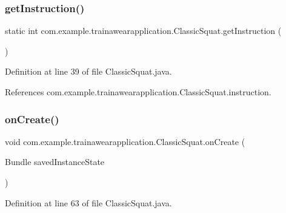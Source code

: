 \subsubsection{\texorpdfstring{getInstruction()}{getInstruction()}}
{\footnotesize\ttfamily static int com.\+example.\+trainawearapplication.\+Classic\+Squat.\+get\+Instruction (\begin{DoxyParamCaption}{ }\end{DoxyParamCaption})\hspace{0.3cm}{\ttfamily [static]}}



Definition at line 39 of file Classic\+Squat.\+java.


\begin{DoxyCode}{0}

\end{DoxyCode}


References com.\+example.\+trainawearapplication.\+Classic\+Squat.\+instruction.

\mbox{\label{classcom_1_1example_1_1trainawearapplication_1_1_classic_squat_afa5582341ba5a9609e4eb7d539741e6a}} 
\subsubsection{\texorpdfstring{onCreate()}{onCreate()}}
{\footnotesize\ttfamily void com.\+example.\+trainawearapplication.\+Classic\+Squat.\+on\+Create (\begin{DoxyParamCaption}\item[{Bundle}]{saved\+Instance\+State }\end{DoxyParamCaption})\hspace{0.3cm}{\ttfamily [protected]}}



Definition at line 63 of file Classic\+Squat.\+java.


